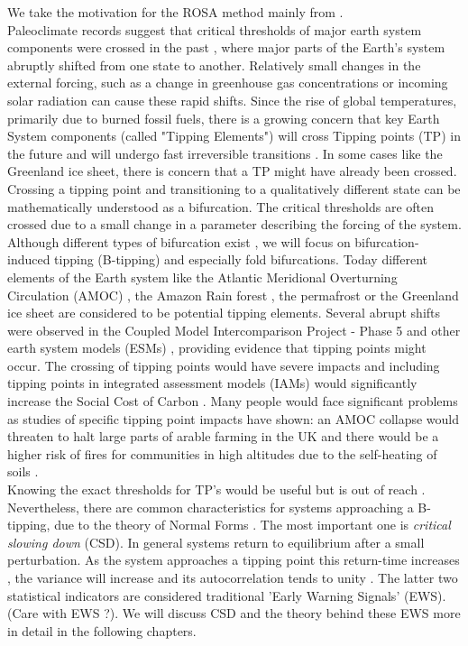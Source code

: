 \documentclass[%
thesis=student,%
coverpage=false,%
titlepage=false,%
headmarks=true, %
english,%
font=libertine, %
math=newpxtx, %
BCOR=5mm,%
coverBCOR=11mm%
]{tumbook}
\begin{document}
We take the motivation for the ROSA method mainly from \cite{Clarke:2023}.\\
Paleoclimate records suggest that critical thresholds of major earth system components were crossed in the past \cite{Brovkin:2021}, where major parts of the Earth's system abruptly shifted from one state to another. Relatively small changes in the external forcing, such as a change in greenhouse gas concentrations or incoming solar radiation can cause these rapid shifts. Since the rise of global temperatures, primarily due to burned fossil fuels, there is a growing concern \cite{Lenton:2019,Steffen:2018,Ritchie:2021} that key Earth System components (called "Tipping Elements") will cross Tipping points (TP) in the future and will undergo fast irreversible transitions \cite{Lenton:2008}. In some cases like the Greenland ice sheet, there is concern that a TP might have already been crossed.
Crossing a tipping point and transitioning to a qualitatively different state can be mathematically understood as a bifurcation. The critical thresholds are often crossed due to a small change in a parameter describing the forcing of the system. Although different types of bifurcation exist \cite{Ashwin:2012}, we will focus on bifurcation-induced tipping (B-tipping) and especially fold bifurcations. Today different elements of the Earth system like the Atlantic Meridional Overturning Circulation (AMOC) \cite{Stommel:1961}, the Amazon Rain forest \cite{Cox:2000}, the permafrost \cite{Steffen:2018} or the Greenland ice sheet \cite{Feldmann:2015} are considered to be potential tipping elements. Several abrupt shifts were observed in the Coupled Model Intercomparison Project - Phase 5 \cite{Taylor:2012} and other earth system models (ESMs) \cite{Drijfhout:2015}, providing evidence that tipping points might occur. The crossing of tipping points would have severe impacts and including tipping points in integrated assessment models (IAMs) would significantly increase the Social Cost of Carbon \cite{Dietz:2021}. Many people would face significant problems as studies of specific tipping point impacts have shown: an AMOC collapse would threaten to halt large parts of arable farming in the UK \cite{Ritchie:2020} and there would be a higher risk of fires for communities in high altitudes due to the self-heating of soils \cite{Clarke:2021}.    \\
Knowing the exact thresholds for TP's would be useful but is out of reach \cite{Steffen:2018,Drijfhout:2015}. Nevertheless, there are common characteristics for systems approaching a B-tipping, due to the theory of Normal Forms \cite{Strogatz:2015,Guckenheimer:1983}. The most important one is \emph{critical slowing down} (CSD). In general systems return to equilibrium after a small perturbation. As the system approaches a tipping point this return-time increases \cite{Scheffer:2012}, the variance will increase and its autocorrelation tends to unity \cite{Scheffer:2009,Held:2004}. The latter two statistical indicators are considered traditional 'Early Warning Signals' (EWS). (Care with EWS ?). We will discuss CSD and the theory behind these EWS more in detail in the following chapters. \\
\end{document}
